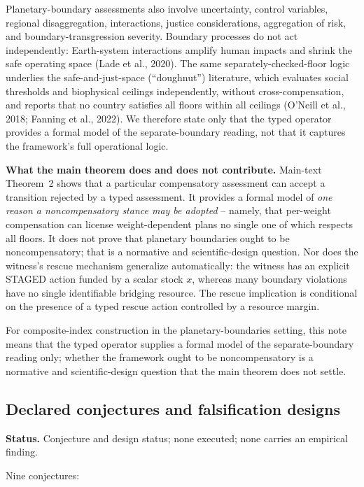 Planetary-boundary assessments also involve uncertainty, control variables, regional disaggregation, interactions, justice considerations, aggregation of risk, and boundary-transgression severity. Boundary processes do not act independently: Earth-system interactions amplify human impacts and shrink the safe operating space (Lade et al., 2020). The same separately-checked-floor logic underlies the safe-and-just-space (``doughnut'') literature, which evaluates social thresholds and biophysical ceilings independently, without cross-compensation, and reports that no country satisfies all floors within all ceilings (O'Neill et al., 2018; Fanning et al., 2022). We therefore state only that the typed operator provides a formal model of the separate-boundary reading, not that it captures the framework's full operational logic.

\textbf{What the main theorem does and does not contribute.} Main-text Theorem~2 shows that a particular compensatory assessment can accept a transition rejected by a typed assessment. It provides a formal model of \emph{one reason a noncompensatory stance may be adopted} -- namely, that per-weight compensation can license weight-dependent plans no single one of which respects all floors. It does not prove that planetary boundaries ought to be noncompensatory; that is a normative and scientific-design question. Nor does the witness's rescue mechanism generalize automatically: the witness has an explicit STAGED action funded by a scalar stock $x$, whereas many boundary violations have no single identifiable bridging resource. The rescue implication is conditional on the presence of a typed rescue action controlled by a resource margin.

For composite-index construction in the planetary-boundaries setting, this note means that the typed operator supplies a formal model of the separate-boundary reading only; whether the framework ought to be noncompensatory is a normative and scientific-design question that the main theorem does not settle.

\subsection{Declared conjectures and falsification designs}

\noindent\textbf{Status.} Conjecture and design status; none executed; none carries an empirical finding.

Nine conjectures:

